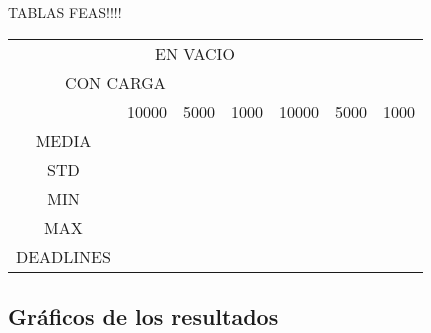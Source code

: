 TABLAS FEAS!!!!


\begin{tabular}{|c|c|c|c|c|c|c|}
\hline
&\multicolumn{3}{|c|}{EN VACIO}\\\multicolumn{3}{|c|}{CON CARGA}\\
\hline
&10000&5000&1000&10000&5000&1000\\
\hline
MEDIA&&&&&&\\
\hline
STD&&&&&&\\
\hline
MIN&&&&&&\\
\hline
MAX&&&&&&\\
\hline
DEADLINES&&&&&&\\
\hline
\end{tabular}

\subsection{Gráficos de los resultados}
